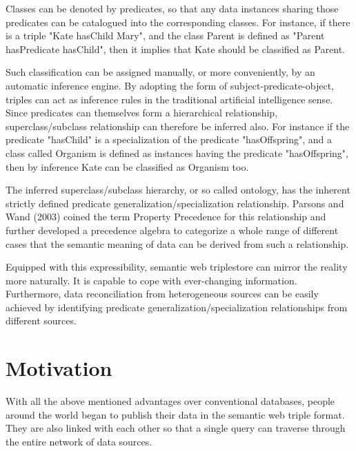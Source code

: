 \documentclass[12pt]{cls}
\begin{document}
Classes can be denoted by predicates, so that any data instances sharing those predicates can be catalogued into the corresponding classes. For instance, if there is a triple "Kate hasChild Mary", and the class Parent is defined as "Parent hasPredicate hasChild", then it implies that Kate should be classified as Parent.

Such classification can be assigned manually, or more conveniently, by an automatic inference engine. By adopting the form of subject-predicate-object, triples can act as inference rules in the traditional artificial intelligence sense. Since predicates can themselves form a hierarchical relationship, superclass/subclass relationship can therefore be inferred also. For instance if the predicate "hasChild" is a specialization of the predicate "hasOffspring", and a class called Organism is defined as instances having the predicate "hasOffspring", then by inference Kate can be classified as Organism too.

The inferred superclass/subclass hierarchy, or so called ontology, has the inherent strictly defined predicate generalization/specialization relationship. Parsons and Wand (2003) coined the term Property Precedence for this relationship and further developed a precedence algebra to categorize a whole range of different cases that the semantic meaning of data can be derived from such a relationship.

Equipped with this expressibility, semantic web triplestore can mirror the reality more naturally. It is capable to cope with ever-changing information. Furthermore, data reconciliation from heterogeneous sources can be easily achieved by identifying predicate generalization/specialization relationships from different sources.

\section{Motivation}

With all the above mentioned advantages over conventional databases, people around the world began to publish their data in the semantic web triple format. They are also linked with each other so that a single query can traverse through the entire network of data sources.
\end{document}
